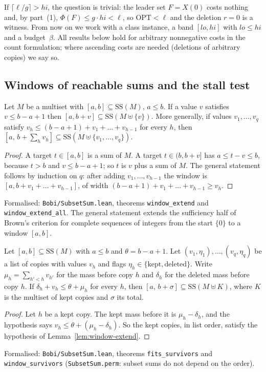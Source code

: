 If $\lceil\ell/g\rceil>hi$, the question is trivial: the leader set $F=X(0)$
costs nothing and, by part~(1), $\Phi(F)\le g\cdot hi<\ell$, so
$\mathrm{OPT}<\ell$ and the deletion $r=0$ is a witness. From now on we work with a class instance, a band
$[lo,hi]$ with $lo\le hi$ and a budget~$\beta$. All results below hold for
arbitrary nonnegative costs in the count formulation; where ascending costs
are needed (deletions of arbitrary copies) we say so.

\subsection{Windows of reachable sums and the stall test}

\begin{lemma}\label{lem:window-extend}
Let $M$ be a multiset with $[a,b]\subseteq\mathrm{SS}(M)$, $a\le b$. If a value $v$
satisfies $v\le b-a+1$ then $[a,b+v]\subseteq\mathrm{SS}(M\uplus\{v\})$. More
generally, if values $v_1,\dots,v_q$ satisfy
$v_h\le (b-a+1)+v_1+\dots+v_{h-1}$ for every $h$, then
$[a,\,b+\sum_h v_h]\subseteq\mathrm{SS}(M\uplus\{v_1,\dots,v_q\})$.
\end{lemma}
\begin{proof}
A target $t\in[a,b]$ is a sum of $M$. A target $t\in(b,b+v]$ has
$a\le t-v\le b$, because $t>b$ and $v\le b-a+1$; so $t$ is $v$ plus a sum of
$M$. The
general statement follows by induction on $q$: after adding $v_1,\dots,v_{h-1}$
the window is $[a,b+v_1+\dots+v_{h-1}]$, of width
$(b-a+1)+v_1+\dots+v_{h-1}\ge v_h$.
\end{proof}
{\raggedright\noindent Formalised: \texttt{Bobi/SubsetSum.lean}, theorems
\texttt{window\_extend} and \texttt{window\_extend\_all}. The general
statement extends the sufficiency half of Brown's criterion for complete
sequences of integers\cite{brown1961note} from the start $\{0\}$ to a window
$[a,b]$.\par}

\begin{lemma}\label{lem:window-survivors}
Let $[a,b]\subseteq\mathrm{SS}(M)$ with $a\le b$ and $\theta=b-a+1$. Let
$(v_1,\eta_1),\dots,(v_q,\eta_q)$ be a list of copies with values $v_h$ and
flags $\eta_h\in\{\text{kept},\text{deleted}\}$. Write $\mu_h=\sum_{h'<h}v_{h'}$
for the mass before copy $h$ and $\delta_h$ for the deleted mass before copy
$h$. If $\delta_h+v_h\le\theta+\mu_h$ for every $h$, then
$[a,\,b+\sigma]\subseteq\mathrm{SS}(M\uplus K)$, where $K$ is the multiset of kept
copies and $\sigma$ its total.
\end{lemma}
\begin{proof}
Let $h$ be a kept copy. The kept mass before it is $\mu_h-\delta_h$, and the
hypothesis says $v_h\le\theta+(\mu_h-\delta_h)$. So the kept copies, in list
order, satisfy the hypothesis of Lemma~\ref{lem:window-extend}.
\end{proof}
{\raggedright\noindent Formalised: \texttt{Bobi/SubsetSum.lean}, theorems
\texttt{fits\_survivors} and \texttt{window\_survivors}
(\texttt{SubsetSum.perm}: subset sums do not depend on the order).\par}

